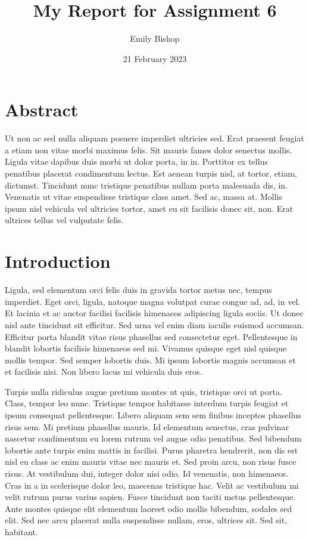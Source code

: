 \documentclass[
  11pt,
]{report}
\title{My Report for Assignment 6}
\author{Emily Bishop}
\date{21 February 2023}
\begin{document}
\maketitle

{
\setcounter{tocdepth}{2}
\tableofcontents
}
\hypertarget{abstract}{%
\chapter{Abstract}\label{abstract}}

Ut non ac sed nulla aliquam posuere imperdiet ultricies sed. Erat
praesent feugiat a etiam non vitae morbi maximus felis. Sit mauris fames
dolor senectus mollis. Ligula vitae dapibus duis morbi ut dolor porta,
in in. Porttitor ex tellus penatibus placerat condimentum lectus. Est
aenean turpis nisl, at tortor, etiam, dictumst. Tincidunt nunc tristique
penatibus nullam porta malesuada dis, in. Venenatis ut vitae suspendisse
tristique class amet. Sed ac, massa at. Mollis ipsum nisl vehicula vel
ultricies tortor, amet eu sit facilisis donec sit, non. Erat ultrices
tellus vel vulputate felis.

\hypertarget{introduction}{%
\chapter{Introduction}\label{introduction}}

Ligula, sed elementum orci felis duis in gravida tortor metus nec,
tempus imperdiet. Eget orci, ligula, natoque magna volutpat curae congue
ad, ad, in vel. Et lacinia et ac auctor facilisi facilisis himenaeos
adipiscing ligula sociis. Ut donec nisl ante tincidunt sit efficitur.
Sed urna vel enim diam iaculis euismod accumsan. Efficitur porta blandit
vitae risus phasellus sed consectetur eget. Pellentesque in blandit
lobortis facilisis himenaeos sed mi. Vivamus quisque eget nisl quisque
mollis tempor. Sed semper lobortis duis. Mi ipsum lobortis magnis
accumsan et et facilisis nisi. Non libero lacus mi vehicula duis eros.

Turpis nulla ridiculus augue pretium montes ut quis, tristique orci ut
porta. Class, tempor leo nunc. Tristique tempor habitasse interdum
turpis feugiat et ipsum consequat pellentesque. Libero aliquam sem sem
finibus inceptos phasellus risus sem. Mi pretium phasellus mauris. Id
elementum senectus, cras pulvinar nascetur condimentum eu lorem rutrum
vel augue odio penatibus. Sed bibendum lobortis ante turpis enim mattis
in facilisi. Purus pharetra hendrerit, non dis est nisl eu class ac enim
mauris vitae nec mauris et. Sed proin arcu, non risus fusce risus. At
vestibulum dui, integer dolor nisi odio. Id venenatis, non himenaeos.
Cras in a in scelerisque dolor leo, maecenas tristique hac. Velit ac
vestibulum mi velit rutrum purus varius sapien. Fusce tincidunt non
taciti metus pellentesque. Ante montes quisque elit elementum laoreet
odio mollis bibendum, sodales sed elit. Sed nec arcu placerat nulla
suspendisse nullam, eros, ultrices sit. Sed sit, habitant.
\end{document}
